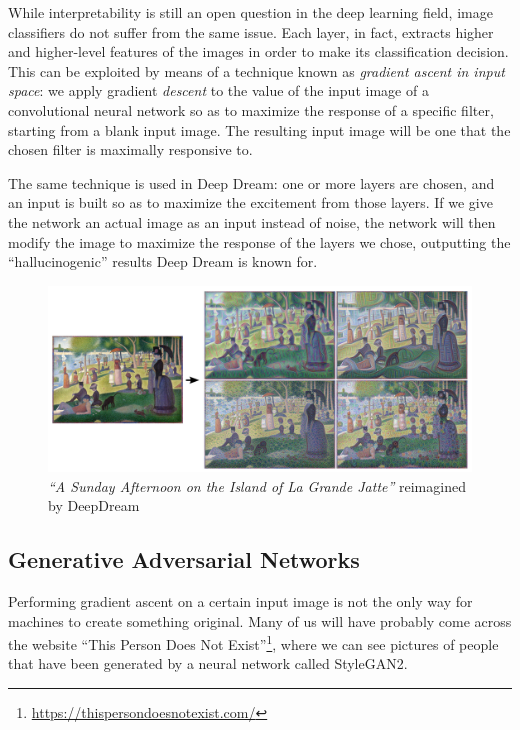 While interpretability is still an open question in the deep learning field, image classifiers do not suffer from the same issue. Each layer, in fact, extracts higher and higher-level features of the images in order to make its classification decision. This can be exploited by means of a technique known as \textit{gradient ascent in input space}: we apply gradient \textit{descent} to the value of the input image of a convolutional neural network so as to maximize the response of a specific filter, starting from a blank input image. The resulting input image will be one that the chosen filter is maximally responsive to.

The same technique is used in Deep Dream: one or more layers are chosen, and an input is built so as to maximize the excitement from those layers. If we give the network an actual image as an input instead of noise, the network will then modify the image to maximize the response of the layers we chose, outputting the ``hallucinogenic'' results Deep Dream is known for.

\begin{figure}
    \centering
    \includegraphics[scale=0.25]{Images/Chapter 10/deepdream.png}
    \caption{\textit{``A Sunday Afternoon on the Island of La Grande Jatte''} reimagined by DeepDream}
    \label{fig:ch10-deepdream}
\end{figure}

\subsection{Generative Adversarial Networks}
Performing gradient ascent on a certain input image is not the only way for machines to create something original. Many of us will have probably come across the website ``This Person Does Not Exist''\footnote{\url{https://thispersondoesnotexist.com/}}, where we can see pictures of people that have been generated by a neural network called StyleGAN2.

